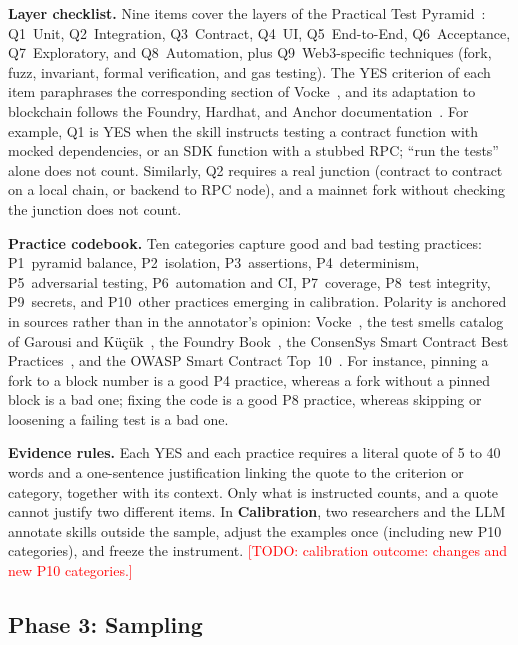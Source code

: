 \documentclass[10pt,conference]{IEEEtran}
\newcommand{\todo}[1]{\textcolor{red}{[TODO: #1]}}
\begin{document}
\textbf{Layer checklist.} Nine items cover the layers of the Practical Test Pyramid~\cite{vocke2018pyramid}: Q1~Unit, Q2~Integration, Q3~Contract, Q4~UI, Q5~End-to-End, Q6~Acceptance, Q7~Exploratory, and Q8~Automation, plus Q9~Web3-specific techniques (fork, fuzz, invariant, formal verification, and gas testing). The YES criterion of each item paraphrases the corresponding section of Vocke~\cite{vocke2018pyramid}, and its adaptation to blockchain follows the Foundry, Hardhat, and Anchor documentation~\cite{foundrybook,hardhatdocs,anchordocs}. For example, Q1 is YES when the skill instructs testing a contract function with mocked dependencies, or an SDK function with a stubbed RPC; ``run the tests'' alone does not count. Similarly, Q2 requires a real junction (contract to contract on a local chain, or backend to RPC node), and a mainnet fork without checking the junction does not count.

\textbf{Practice codebook.} Ten categories capture good and bad testing practices: P1~pyramid balance, P2~isolation, P3~assertions, P4~determinism, P5~adversarial testing, P6~automation and CI, P7~coverage, P8~test integrity, P9~secrets, and P10~other practices emerging in calibration. Polarity is anchored in sources rather than in the annotator's opinion: Vocke~\cite{vocke2018pyramid}, the test smells catalog of Garousi and K\"u\c{c}\"uk~\cite{garousi2018smells}, the Foundry Book~\cite{foundrybook}, the ConsenSys Smart Contract Best Practices~\cite{consensys}, and the OWASP Smart Contract Top~10~\cite{owaspsc}. For instance, pinning a fork to a block number is a good P4 practice, whereas a fork without a pinned block is a bad one; fixing the code is a good P8 practice, whereas skipping or loosening a failing test is a bad one.

\textbf{Evidence rules.} Each YES and each practice requires a literal quote of 5 to 40 words and a one-sentence justification linking the quote to the criterion or category, together with its context. Only what is instructed counts, and a quote cannot justify two different items. In \textbf{Calibration}, two researchers and the LLM annotate \NCal skills outside the sample, adjust the examples once (including new P10 categories), and freeze the instrument. \todo{calibration outcome: changes and new P10 categories.}

\subsection{Phase 3: Sampling}
\label{sec:sampling}
\end{document}
